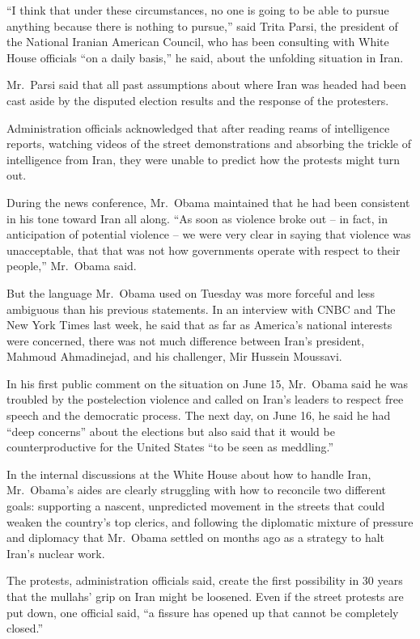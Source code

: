 ﻿\documentclass[12pt,a4paper,onecolumn]{article}
\begin{document}
``I think that under these circumstances, no one is going to be able to pursue anything because
there is nothing to pursue,'' said Trita Parsi, the president of the National Iranian American
Council, who has been consulting with White House officials ``on a daily basis,'' he said, about the
unfolding situation in Iran.

Mr.~Parsi said that all past assumptions about where Iran was headed had been cast aside by the
disputed election results and the response of the protesters.

Administration officials acknowledged that after reading reams of intelligence reports, watching
videos of the street demonstrations and absorbing the trickle of intelligence from Iran, they were
unable to predict how the protests might turn out.

During the news conference, Mr.~Obama maintained that he had been consistent in his tone toward Iran
all along. ``As soon as violence broke out -- in fact, in anticipation of potential violence -- we
were very clear in saying that violence was unacceptable, that that was not how governments operate
with respect to their people,'' Mr.~Obama said.

But the language Mr.~Obama used on Tuesday was more forceful and less ambiguous than his previous
statements. In an interview with CNBC and The New York Times last week, he said that as far as
America's national interests were concerned, there was not much difference between Iran's president,
Mahmoud Ahmadinejad, and his challenger, Mir Hussein Moussavi.

In his first public comment on the situation on June 15, Mr.~Obama said he was troubled by the
postelection violence and called on Iran's leaders to respect free speech and the democratic
process. The next day, on June 16, he said he had ``deep concerns'' about the elections but also
said that it would be counterproductive for the United States ``to be seen as meddling.''

In the internal discussions at the White House about how to handle Iran, Mr.~Obama's aides are
clearly struggling with how to reconcile two different goals: supporting a nascent, unpredicted
movement in the streets that could weaken the country's top clerics, and following the diplomatic
mixture of pressure and diplomacy that Mr.~Obama settled on months ago as a strategy to halt Iran's
nuclear work.

The protests, administration officials said, create the first possibility in 30 years that the
mullahs' grip on Iran might be loosened. Even if the street protests are put down, one official
said, ``a fissure has opened up that cannot be completely closed.''
\end{document}
